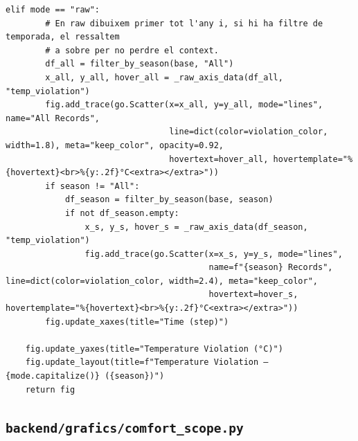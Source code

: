 \documentclass[10pt,a4paper]{article}
\begin{document}
\begin{lstlisting}[style=studioPython,caption={backend/grafics/comfort.py},label={lst:backend-grafics-comfort-py}]
    elif mode == "raw":
        # En raw dibuixem primer tot l'any i, si hi ha filtre de temporada, el ressaltem
        # a sobre per no perdre el context.
        df_all = filter_by_season(base, "All")
        x_all, y_all, hover_all = _raw_axis_data(df_all, "temp_violation")
        fig.add_trace(go.Scatter(x=x_all, y=y_all, mode="lines", name="All Records",
                                 line=dict(color=violation_color, width=1.8), meta="keep_color", opacity=0.92,
                                 hovertext=hover_all, hovertemplate="%{hovertext}<br>%{y:.2f}°C<extra></extra>"))
        if season != "All":
            df_season = filter_by_season(base, season)
            if not df_season.empty:
                x_s, y_s, hover_s = _raw_axis_data(df_season, "temp_violation")
                fig.add_trace(go.Scatter(x=x_s, y=y_s, mode="lines",
                                         name=f"{season} Records", line=dict(color=violation_color, width=2.4), meta="keep_color",
                                         hovertext=hover_s, hovertemplate="%{hovertext}<br>%{y:.2f}°C<extra></extra>"))
        fig.update_xaxes(title="Time (step)")

    fig.update_yaxes(title="Temperature Violation (°C)")
    fig.update_layout(title=f"Temperature Violation – {mode.capitalize()} ({season})")
    return fig
\end{lstlisting}


\subsection{\texorpdfstring{\texttt{backend/grafics/comfort\_scope.py}}{backend/grafics/comfort\_scope.py}}
\end{document}
